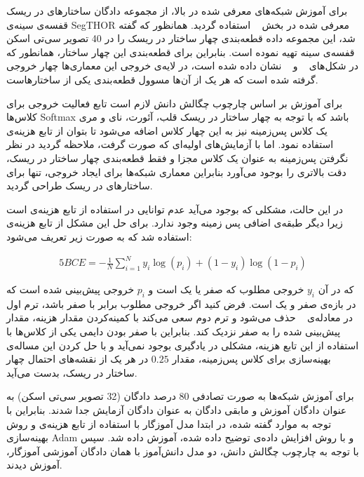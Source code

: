 برای آموزش شبکه‌های معرفی شده در بالا، از مجموعه دادگان ساختارهای در ریسک قفسه‌ی سینه‌ی SegTHOR معرفی شده در بخش ~ استفاده گردید. همانظور که گفته شد، این مجموعه داده قطعه‌بندی چهار ساختار در ریسک را در 40 تصویر سی‌تی اسکن قفسه‌ی سینه تهیه نموده است. بنابراین برای قطعه‌بندی این چهار ساختار، همانطور که در شکل‌های ~ و ~ نشان داده شده است، در لایه‌ی خروجی این معماری‌ها چهار خروجی گرفته شده است که هر یک از آن‌ها مسوول قطعه‌بندی یکی از ساختارهاست.

برای آموزش بر اساس چارچوب چگالش دانش لازم است تابع فعالیت خروجی برای کلاس‌ها Softmax باشد که با توجه به چهار ساختار در ریسک قلب، آئورت، نای و مری یک کلاس پس‌زمینه نیز به این چهار کلاس اضافه می‌شود تا بتوان از تابع هزینه‌ی  استفاده نمود. اما با آزمایش‌های اولیه‌ای که صورت گرفت، ملاحظه گردید در نظر نگرفتن پس‌زمینه به عنوان یک کلاس مجزا و فقط قطعه‌بندی چهار ساختار در ریسک، دقت بالاتری را بوجود می‌آورد بنابراین معماری شبکه‌ها برای ایجاد خروجی، تنها برای ساختارهای در ریسک طراحی گردید.

در این حالت، مشکلی که بوجود می‌آید عدم توانایی در استفاده از تابع هزینه‌ی  است زیرا دیگر طبقه‌ی اضافی پس زمینه وجود ندارد. برای حل این مشکل از تابع هزینه‌ی  استفاده شد که به صورت زیر تعریف می‌شود:

\begin{alignat}{5}
	BCE = -\frac{1}{N}\sum_{i=1}^N y_i \log(p_i)+(1-y_i)  \log(1-p_i)  \label{bce} 
\end{alignat}

که در آن $y_i$ خروجی مطلوب که صفر یا یک است و $p_i$ خروجی پیش‌بینی شده است که در بازه‌ی صفر و یک است. فرض کنید اگر خروجی مطلوب برابر با صفر باشد، ترم اول در معادله‌ی ~ حذف می‌شود و ترم دوم سعی می‌کند با کمینه‌کردن مقدار هزینه، مقدار پیش‌بینی شده را به صفر نزدیک کند. بنابراین با صفر بودن دایمی یکی از کلاس‌ها با استفاده از این تابع هزینه، مشکلی در یادگیری بوجود نمی‌آید و با حل کردن این مساله‌ی بهینه‌سازی برای کلاس پس‌زمینه، مقدار $0.25$ در هر یک از نقشه‌های احتمال چهار ساختار در ریسک، بدست می‌آید.

برای آموزش شبکه‌ها به صورت تصادفی 80 درصد دادگان (32 تصویر سی‌تی اسکن) به عنوان دادگان آموزش و مابقی دادگان به عنوان دادگان آزمایش جدا شدند. بنابراین با توجه به موارد گفته شده، در ابتدا مدل آموزگار با استفاده از تابع هزینه‌ی  و روش بهینه‌سازی Adam و با روش افزایش داده‌ی توضیح داده شده، آموزش داده شد. سپس با توجه به چارچوب چگالش دانش، دو مدل دانش‌آموز با همان دادگان آموزشی آموزگار، آموزش دیدند.

